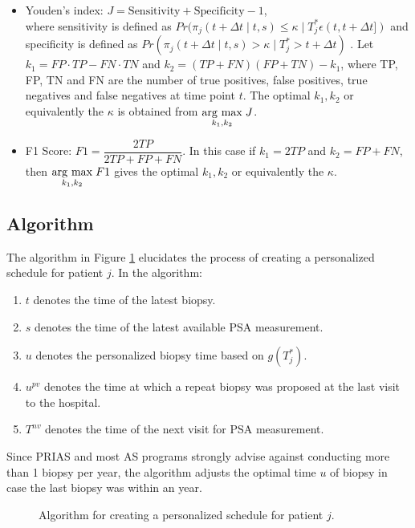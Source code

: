 \begin{itemize}

\item Youden's index: $J = \text{Sensitivity} + \text{Specificity}- 1$,\\
where sensitivity is defined as $Pr(\pi_j(t + \Delta t \mid t,s) \leq \kappa \mid T^*_j \epsilon (t, t + \Delta t])$ and specificity is defined as $Pr(\pi_j(t + \Delta t \mid t,s) > \kappa \mid T^*_j > t + \Delta t)$ \citep{rizopoulosJMbayes}. Let $k_1 = FP \cdot TP - FN \cdot TN$ and $k_2 = (TP+FN)(FP+TN) - k_1$, where TP, FP, TN and FN are the number of true positives, false positives, true negatives and false negatives at time point $t$. The optimal $k_1, k_2$ or equivalently the $\kappa$ is obtained from $\underset{k_1, k_2}{\operatorname{arg}\,\operatorname{max}}\; J$.

\item F1 Score: $F1 = \dfrac{2TP}{2TP + FP + FN}$. In this case if $k_1 = 2TP$ and $k_2 = FP + FN$, then $\underset{k_1, k_2}{\operatorname{arg}\,\operatorname{max}}\; F1$ gives the optimal $k_1, k_2$ or equivalently the $\kappa$.
\end{itemize}

\subsection{Algorithm}
\label{subsec : pers_sched_algorithm}
The algorithm in Figure \ref{fig : sched_algorithm} elucidates the process of creating a personalized schedule for patient $j$. In the algorithm:

\begin{enumerate}
\item $t$ denotes the time of the latest biopsy.
\item $s$ denotes the time of the latest available PSA measurement.
\item $u$ denotes the personalized biopsy time based on $g(T^*_j)$.
\item $u^{pv}$ denotes the time at which a repeat biopsy was proposed at the last visit to the hospital.
\item $T^{nv}$ denotes the time of the next visit for PSA measurement.
\end{enumerate}
Since PRIAS and most AS programs strongly advise against conducting more than 1 biopsy per year, the algorithm adjusts the optimal time $u$ of biopsy in case the last biopsy was within an year.

\begin{figure}
\centering
\captionsetup{justification=centering}

\caption{Algorithm for creating a personalized schedule for patient $j$.} 
\label{fig : sched_algorithm}
\end{figure}